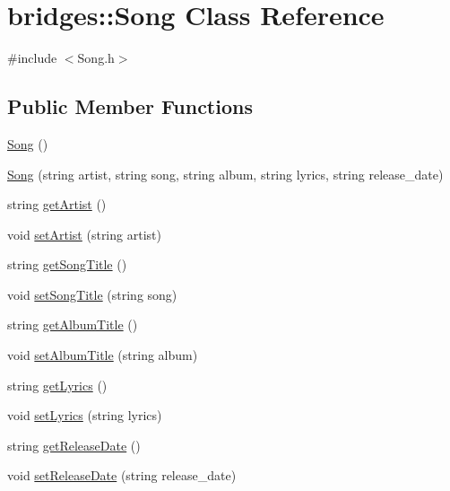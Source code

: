 \hypertarget{classbridges_1_1_song}{}\section{bridges\+:\+:Song Class Reference}
\label{classbridges_1_1_song}


{\ttfamily \#include $<$Song.\+h$>$}

\subsection*{Public Member Functions}
\begin{DoxyCompactItemize}
\item 
\mbox{\hyperlink{classbridges_1_1_song_aa938ae0bd6d566d6e2a6bf30beeb0ea5}{Song}} ()
\item 
\mbox{\hyperlink{classbridges_1_1_song_a45112419f649ca32150b170c946d3441}{Song}} (string artist, string song, string album, string lyrics, string release\+\_\+date)
\item 
string \mbox{\hyperlink{classbridges_1_1_song_a902a2a91327f1ffa87a64bb0b78c274e}{get\+Artist}} ()
\item 
void \mbox{\hyperlink{classbridges_1_1_song_a644985bf7524af0200b42f9a5148e38e}{set\+Artist}} (string artist)
\item 
string \mbox{\hyperlink{classbridges_1_1_song_abd12d9a6d8dfa0ff53aebbf7e6f2974d}{get\+Song\+Title}} ()
\item 
void \mbox{\hyperlink{classbridges_1_1_song_aed396fe05fd2bcb61e23ecca0d4a2047}{set\+Song\+Title}} (string song)
\item 
string \mbox{\hyperlink{classbridges_1_1_song_ae3165ded5158a331e7cbb945744f2be6}{get\+Album\+Title}} ()
\item 
void \mbox{\hyperlink{classbridges_1_1_song_a9f9b3f86914ee18db5de48166b350723}{set\+Album\+Title}} (string album)
\item 
string \mbox{\hyperlink{classbridges_1_1_song_a1c0c864edff5be9f291644d4fce5ec6f}{get\+Lyrics}} ()
\item 
void \mbox{\hyperlink{classbridges_1_1_song_ae0a57f15c3f015238c28fe08d1adea5a}{set\+Lyrics}} (string lyrics)
\item 
string \mbox{\hyperlink{classbridges_1_1_song_add7a9b0ef7931cbacbdb28922a2f50ea}{get\+Release\+Date}} ()
\item 
void \mbox{\hyperlink{classbridges_1_1_song_a8e9453f5ec33b5d9865788beb4cc68e0}{set\+Release\+Date}} (string release\+\_\+date)
\end{DoxyCompactItemize}


